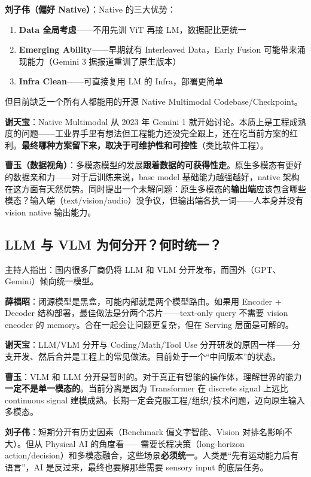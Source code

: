 \documentclass[a4paper]{article}
\begin{document}
\textbf{刘子伟（偏好 Native）}：Native 的三大优势：
\begin{enumerate}
  \item \textbf{Data 全局考虑}——不用先训 ViT 再接 LM，数据配比更统一
  \item \textbf{Emerging Ability}——早期就有 Interleaved Data，Early Fusion 可能带来涌现能力（Gemini 3 据报道重训了原生版本）
  \item \textbf{Infra Clean}——可直接复用 LM 的 Infra，部署更简单
\end{enumerate}
但目前缺乏一个所有人都能用的开源 Native Multimodal Codebase/Checkpoint。

\textbf{谢天宝}：Native Multimodal 从 2023 年 Gemini 1 就开始讨论。本质上是工程成熟度的问题——工业界手里有想法但工程能力还没完全跟上，还在吃当前方案的红利。\textbf{最终哪种方案留下来，取决于可维护性和可控性}（类比软件工程）。

\textbf{曹玉（数据视角）}：多模态模型的发展\textbf{跟着数据的可获得性走}。原生多模态有更好的数据亲和力——对于后训练来说，base model 基础能力越强越好，native 架构在这方面有天然优势。同时提出一个未解问题：原生多模态的\textbf{输出端}应该包含哪些模态？输入端（text/vision/audio）没争议，但输出端各执一词——人本身并没有 vision native 输出能力。

\subsection{LLM 与 VLM 为何分开？何时统一？}

主持人指出：国内很多厂商仍将 LLM 和 VLM 分开发布，而国外（GPT、Gemini）倾向统一模型。

\textbf{薛福昭}：闭源模型是黑盒，可能内部就是两个模型路由。如果用 Encoder + Decoder 结构部署，最佳做法是分两个芯片——text-only query 不需要 vision encoder 的 memory。合在一起会让问题更复杂，但在 Serving 层面是可解的。

\textbf{谢天宝}：LLM/VLM 分开与 Coding/Math/Tool Use 分开研发的原因一样——分支开发、然后合并是工程上的常见做法。目前处于一个``中间版本''的状态。

\textbf{曹玉}：VLM 和 LLM 分开是暂时的。对于真正有智能的操作体，理解世界的能力\textbf{一定不是单一模态的}。当前分离是因为 Transformer 在 discrete signal 上远比 continuous signal 建模成熟。长期一定会克服工程/组织/技术问题，迈向原生输入多模态。

\textbf{刘子伟}：短期分开有历史因素（Benchmark 偏文字智能、Vision 对排名影响不大）。但从 Physical AI 的角度看——需要长程决策（long-horizon action/decision）和多模态融合，这些场景\textbf{必须统一}。人类是``先有运动能力后有语言''，AI 是反过来，最终也要解那些需要 sensory input 的底层任务。
\end{document}
